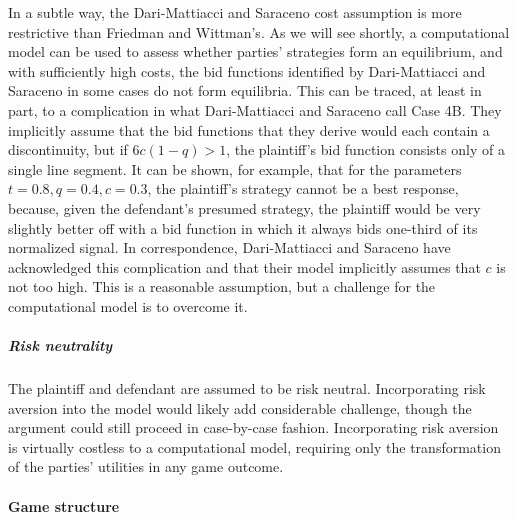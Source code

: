 \documentclass{article}
\begin{document}
In a subtle way, the Dari-Mattiacci and Saraceno cost assumption is more restrictive than Friedman and Wittman's. As we will see shortly, a computational model can be used to assess whether parties' strategies form an equilibrium, and with sufficiently high costs, the bid functions identified by Dari-Mattiacci and Saraceno in some cases do not form equilibria. This can be traced, at least in part, to a complication in what Dari-Mattiacci and Saraceno call Case 4B. They implicitly assume that the bid functions that they derive would each contain a discontinuity, but if $6c(1-q) > 1$, the plaintiff's bid function consists only of a single line segment. It can be shown, for example, that for the parameters $t = 0.8, q = 0.4, c = 0.3$, the plaintiff's strategy cannot be a best response, because, given the defendant's presumed strategy, the plaintiff would be very slightly better off with a bid function in which it always bids one-third of its normalized signal. In correspondence, Dari-Mattiacci and Saraceno have acknowledged this complication and that their model implicitly assumes that $c$ is not too high. This is a reasonable assumption, but a challenge for the computational model is to overcome it.

\subparagraph{Risk neutrality}The plaintiff and defendant are assumed to be risk neutral. Incorporating risk aversion into the model would likely add considerable challenge, though the argument could still proceed in case-by-case fashion. Incorporating risk aversion is virtually costless to a computational model, requiring only the transformation of the parties' utilities in any game outcome. 

\paragraph{Game structure}
\end{document}
